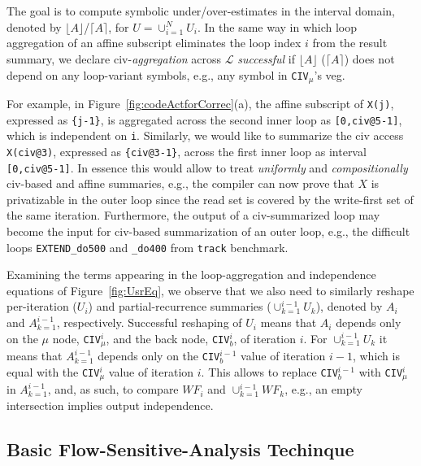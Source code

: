 \documentclass{sig-alternate}
\begin{document}
The goal is to compute symbolic under/over-estimates in the 
interval domain, denoted by $\lfloor A \rfloor$/$\lceil A \rceil$, 
for $U = \cup_{i=1}^{N} U_i$.
%
In the same way in which loop aggregation of an affine subscript  
eliminates the loop index $i$ from the result summary,
we declare {\sc civ}-{\em aggregation} across $\mathcal{L}$ {\em successful} 
if $\lfloor A \rfloor$ ($\lceil A \rceil$) does not depend on any loop-variant
symbols, e.g., any symbol in {\tt CIV}$_{\mu}$'s  {\sc veg}. %

For example, in Figure~\ref{fig:codeActforCorrec}(a), the affine
subscript of {\tt X(j)}, expressed as {\tt\{j-1\}}, is aggregated across 
the second inner loop as {\tt[0,civ@5-1]}, which is independent on {\tt i}. 
Similarly, we would like to summarize the {\sc civ} access
{\tt X(civ@3)}, expressed as {\tt\{civ@3-1\}}, across 
the first inner loop as interval {\tt[0,civ@5-1]}. 
%
In essence this would allow to treat {\em uniformly} and {\em compositionally} 
{\sc civ}-based and affine summaries, e.g., the compiler can now prove that $X$ 
is privatizable in the outer loop since the read set is covered by the write-first 
set of the same iteration. 
Furthermore, the output of a {\sc civ}-summarized loop may 
become the input for {\sc civ}-based summarization of an outer loop,
e.g., the difficult loops {\tt EXTEND\_do500} and {\tt \_do400}
from {\tt track} benchmark.


%
Examining the terms appearing in the loop-aggregation and independence 
equations of Figure~\ref{fig:UsrEq}, we observe that we also need to similarly
reshape per-iteration ($U_i$) and partial-recurrence summaries 
($\cup_{k=1}^{i-1} U_k$), 
denoted by $A_i$ and $A_{k=1}^{i-1}$, respectively. 
%
Successful reshaping of $U_i$ means that $A_i$
depends only on the $\mu$ node, {\tt CIV}$_{\mu}^{i}$, 
and the back node, {\tt CIV}$_{b}^{i}$, of iteration $i$.
For $\cup_{k=1}^{i-1} U_k$ it means that $A_{k=1}^{i-1}$ depends
only on the {\tt CIV}$_{b}^{i-1}$ value of iteration $i-1$, which is
equal with the  {\tt CIV}$_{\mu}^{i}$ value of iteration $i$.
This allows to replace {\tt CIV}$_b^{i-1}$ with {\tt CIV}$_{\mu}^i$ in
$A_{k=1}^{i-1}$, and, as such, to compare $WF_i$ and $\cup_{k=1}^{i-1} WF_k$, 
e.g., an empty intersection implies output independence. 
%

\subsection{Basic Flow-Sensitive-Analysis Techinque}
\label{subsec:BasicTechn}
\end{document}
